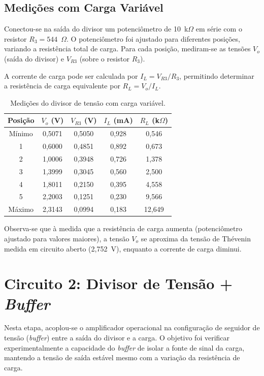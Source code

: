 \subsection{Medições com Carga Variável}

Conectou-se na saída do divisor um potenciômetro de 10~k$\Omega$ em série com o resistor $R_3 = 544$~$\Omega$. O potenciômetro foi ajustado para diferentes posições, variando a resistência total de carga. Para cada posição, mediram-se as tensões $V_o$ (saída do divisor) e $V_{R3}$ (sobre o resistor $R_3$).

A corrente de carga pode ser calculada por $I_L = V_{R3}/R_3$, permitindo determinar a resistência de carga equivalente por $R_L = V_o/I_L$.

\begin{table}[H]
    \centering
    \ABNTEXfontereduzida
    \caption{Medições do divisor de tensão com carga variável.}
    \label{tab:divisor_carga}
    \begin{tabular}{c|c|c|c|c}
        \hline
        \textbf{Posição} & \textbf{$V_o$ (V)} & \textbf{$V_{R3}$ (V)} & \textbf{$I_L$ (mA)} & \textbf{$R_L$ (k$\Omega$)} \\ \hline
        Mínimo & 0,5071 & 0,5050 & 0,928 & 0,546 \\ [3pt]
        1 & 0,6000 & 0,4851 & 0,892 & 0,673 \\ [3pt]
        2 & 1,0006 & 0,3948 & 0,726 & 1,378 \\ [3pt]
        3 & 1,3999 & 0,3045 & 0,560 & 2,500 \\ [3pt]
        4 & 1,8011 & 0,2150 & 0,395 & 4,558 \\ [3pt]
        5 & 2,2003 & 0,1251 & 0,230 & 9,566 \\ [3pt]
        Máximo & 2,3143 & 0,0994 & 0,183 & 12,649 \\ [3pt]
        \hline
    \end{tabular}
\end{table}

Observa-se que à medida que a resistência de carga aumenta (potenciômetro ajustado para valores maiores), a tensão $V_o$ se aproxima da tensão de Thévenin medida em circuito aberto (2,752~V), enquanto a corrente de carga diminui.

\section{Circuito 2: Divisor de Tensão + \textit{Buffer}}
Nesta etapa, acoplou-se o amplificador operacional na configuração de seguidor de tensão (\textit{buffer}) entre a saída do divisor e a carga. O objetivo foi verificar experimentalmente a capacidade do \textit{buffer} de isolar a fonte de sinal da carga, mantendo a tensão de saída estável mesmo com a variação da resistência de carga.
